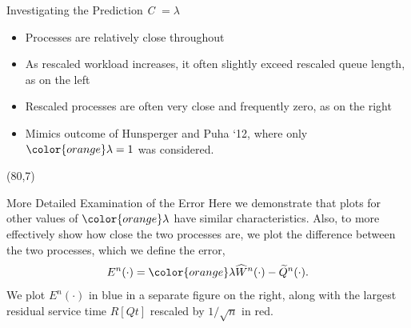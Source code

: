 \documentclass[16pt]{beamer}
\newcommand{\What}{\widehat{W}^{n}(t)}
\newcommand{\Qtild}{\widetilde{Q}^{n}(t)}
\newcommand{\Wfhat}{\widehat{W}^{n}(\cdot)}
\newcommand{\Qftild}{\widetilde{Q}^{n}(\cdot)}
\newcommand{\error}{E^{n}(\cdot)}
\begin{document}
\begin{frame}
\begin{textblock}{35}
\begin{block}{\huge Investigating the Prediction {\color{orange} \emph{C } $=\lambda$}}
\begin{itemize}
\item Processes are relatively close throughout
\item As rescaled workload increases, it often slightly exceed rescaled queue length, as on the left
\item Rescaled processes are often very close and frequently zero, as on the right
\item Mimics outcome of Hunsperger and Puha `12, where only ${\color{orange}\lambda}=1$ was considered.
\end{itemize}
\end{block}

\end{textblock}







\begin{textblock}{35}(80,7)
\begin{block}{\huge More Detailed Examination of the Error}
Here we demonstrate that plots for other values of ${\color{orange}\lambda}$ have similar
characteristics.  Also, to more effectively show how close the two processes are,
we plot the difference between the two processes, which we define the error,
{\color{blue}
\[
\error = {\color{orange}\lambda} \Wfhat - \Qftild.
\]
}
We plot {\color{blue}$\error$} in blue in a separate figure on the right,
along with the largest residual service time {\color{red}$R[Qt]$ rescaled by $1/\sqrt{n}$ in red}.
\vspace{\baselineskip}


\end{block}
\end{textblock}
\end{frame}
\end{document}
